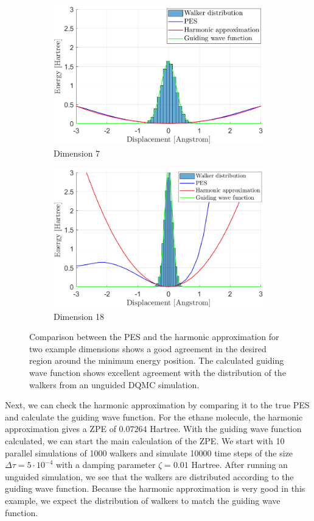 \documentclass [12pt]{report}
\begin{document}
\begin{figure}[h]
\begin{subfigure}{0.5\textwidth}
\includegraphics[width=\linewidth]{walkers1.png} 
\caption{Dimension 7}
\label{dim7}
\end{subfigure}
\begin{subfigure}{0.5\textwidth}
\includegraphics[width=\linewidth]{walkers2.png}
\caption{Dimension 18}
\label{dim16}
\end{subfigure}
\caption{Comparison between the PES and the harmonic approximation for two example dimensions shows a good agreement in the desired region around the minimum energy position. The calculated guiding wave function shows excellent agreement with the distribution of the walkers from an unguided DQMC simulation.}
\label{trialwf}
\end{figure}
Next, we can check the harmonic approximation by comparing it to the true PES and calculate the guiding wave function. For the ethane molecule, the harmonic approximation gives a ZPE of $0.07264$ Hartree. With the guiding wave function calculated, we can start the main calculation of the ZPE. We start with 10 parallel simulations of 1000 walkers and simulate 10000 time steps of the size $\Delta \tau = 5 \cdot 10^{-4}$ with a damping parameter $\zeta = 0.01$ Hartree. After running an unguided simulation, we see that the walkers are distributed according to the guiding wave function. Because the harmonic approximation is very good in this example, we expect the distribution of walkers to match the guiding wave function. 
\end{document}

